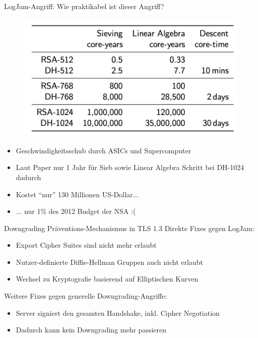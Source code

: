 \documentclass{f4_beamer_metropolis}
\begin{document}
\begin{frame}{LogJam-Angriff: Wie praktikabel ist dieser Angriff?}
  \begin{figure}[!h]
    \centering
    \vspace*{-0.35cm}
    \includegraphics[scale=0.55]{./images/logjam-speeds.png}
    \label{fig:logjam-practical}
  \end{figure}

  \begin{itemize}
    \item Geschwindigkeitsschub durch ASICs und Supercomputer
    \item Laut Paper nur 1 Jahr für Sieb sowie Linear Algebra Schritt bei DH-1024 dadurch
    \item Kostet \enquote{nur} 130 Millionen US-Dollar...
    \item ... nur 1\% des 2012 Budget der NSA :(
  \end{itemize}
\end{frame}

\begin{frame}{Downgrading Präventions-Mechanismus in TLS 1.3}
Direkte Fixes gegen LogJam:
\begin{itemize}
  \item Export Cipher Suites sind nicht mehr erlaubt
  \item Nutzer-definierte Diffie-Hellman Gruppen auch nicht erlaubt
  \item Wechsel zu Kryptografie basierend auf Elliptischen Kurven
\end{itemize}
Weitere Fixes gegen generelle Downgrading-Angriffe:
\begin{itemize}
  \item Server signiert den gesamten Handshake, inkl. Cipher Negotiation
  \item Dadurch kann kein Downgrading mehr passieren
\end{itemize}

\end{frame}
\end{document}
